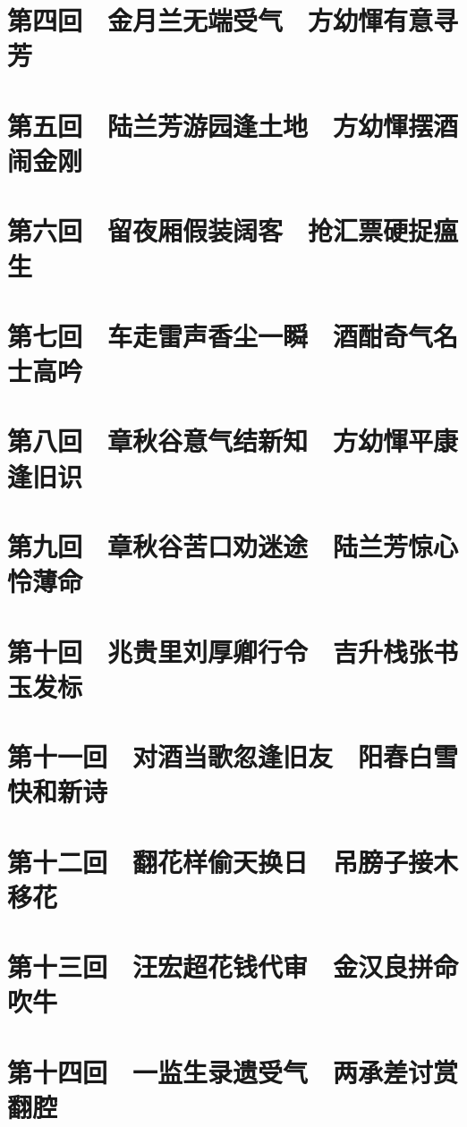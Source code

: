 \documentclass[12pt,UTF8]{ctexbook}
\begin{document}
\chapter{第四回　金月兰无端受气　方幼惲有意寻芳}
\chapter{第五回　陆兰芳游园逢土地　方幼惲摆酒闹金刚}
\chapter{第六回　留夜厢假装阔客　抢汇票硬捉瘟生}

\chapter{第七回　车走雷声香尘一瞬　酒酣奇气名士高吟}

\chapter{第八回　章秋谷意气结新知　方幼惲平康逢旧识}

\chapter{第九回　章秋谷苦口劝迷途　陆兰芳惊心怜薄命}

\chapter{第十回　兆贵里刘厚卿行令　吉升栈张书玉发标}

\chapter{第十一回　对酒当歌忽逢旧友　阳春白雪快和新诗}

\chapter{第十二回　翻花样偷天换日　吊膀子接木移花}

\chapter{第十三回　汪宏超花钱代审　金汉良拼命吹牛}

\chapter{第十四回　一监生录遗受气　两承差讨赏翻腔}
\end{document}
